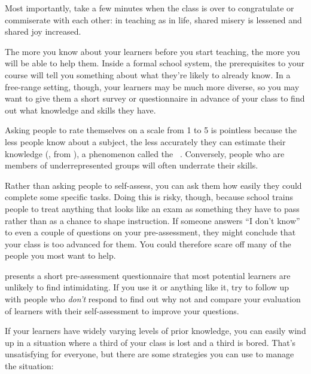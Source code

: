 Most importantly,
take a few minutes when the class is over to congratulate or commiserate with each other:
in teaching as in life,
shared misery is lessened and shared joy increased.


The more you know about your learners before you start teaching,
the more you will be able to help them.
Inside a formal school system,
the prerequisites to your course will tell you something about
what they're likely to already know.
In a free-range setting,
though,
your learners may be much more diverse,
so you may want to give them a short survey or questionnaire in advance of your class
to find out what knowledge and skills they have.

Asking people to rate themselves on a scale from 1 to 5 is pointless
because the less people know about a subject,
the less accurately they can estimate their knowledge
(,
from ),
a phenomenon called the ~\cite{Krug1999}.
Conversely,
people who are members of underrepresented groups will often underrate their skills.


Rather than asking people to self-assess,
you can ask them how easily they could complete some specific tasks.
Doing this is risky,
though,
because school trains people
to treat anything that looks like an exam as something they have to pass
rather than as a chance to shape instruction.
If someone answers ``I don't know'' to even a couple of questions on your pre-assessment,
they might conclude that your class is too advanced for them.
You could therefore scare off many of the people you most want to help.

 presents a short pre-assessment questionnaire
that most potential learners are unlikely to find intimidating.
If you use it or anything like it,
try to follow up with people who \emph{don't} respond to find out why not
and compare your evaluation of learners with their self-assessment
to improve your questions.


If your learners have widely varying levels of prior knowledge,
you can easily wind up in a situation where a third of your class is lost
and a third is bored.
That's unsatisfying for everyone,
but there are some strategies you can use to manage the situation:

